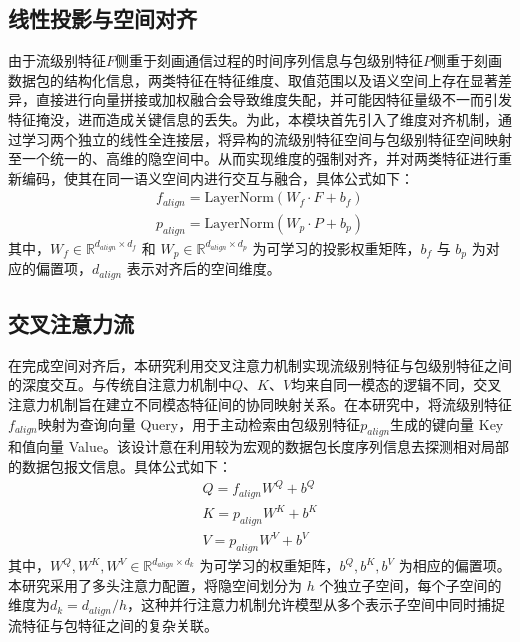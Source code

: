 \subsection{线性投影与空间对齐}
由于流级别特征$F$侧重于刻画通信过程的时间序列信息与包级别特征$P$侧重于刻画数据包的结构化信息，两类特征在特征维度、取值范围以及语义空间上存在显著差异，直接进行向量拼接或加权融合会导致维度失配，并可能因特征量级不一而引发特征掩没，进而造成关键信息的丢失。为此，本模块首先引入了维度对齐机制，通过学习两个独立的线性全连接层，将异构的流级别特征空间与包级别特征空间映射至一个统一的、高维的隐空间中。从而实现维度的强制对齐，并对两类特征进行重新编码，使其在同一语义空间内进行交互与融合，具体公式如下：
\begin{equation}
  \begin{gathered}
  f_{align} = \text{LayerNorm}(W_f \cdot F + b_f) \\
  p_{align} = \text{LayerNorm}(W_p \cdot P + b_p)
  \end{gathered}
  \label{eq:align2}
\end{equation}
其中，$W_f \in \mathbb{R}^{d_{align} \times d_f}$ 和 $W_p \in \mathbb{R}^{d_{align} \times d_p}$ 为可学习的投影权重矩阵，$b_f$ 与 $b_p$ 为对应的偏置项，$d_{align}$ 表示对齐后的空间维度。

\subsection{交叉注意力流}
在完成空间对齐后，本研究利用交叉注意力机制实现流级别特征与包级别特征之间的深度交互。与传统自注意力机制中$Q$、$K$、$V$均来自同一模态的逻辑不同，交叉注意力机制旨在建立不同模态特征间的协同映射关系。在本研究中，将流级别特征$f_{align}$映射为查询向量 Query，用于主动检索由包级别特征$p_{align}$生成的键向量 Key 和值向量 Value。该设计意在利用较为宏观的数据包长度序列信息去探测相对局部的数据包报文信息。具体公式如下：
\begin{equation}
  \begin{gathered}
  Q = f_{align} W^Q + b^Q\\
  K = p_{align} W^K + b^K\\
  V = p_{align} W^V + b^V
  \end{gathered}
  \label{eq:attention}
\end{equation}
其中，$W^Q, W^K, W^V \in \mathbb{R}^{d_{align} \times d_k}$ 为可学习的权重矩阵，$b^Q, b^K, b^V$ 为相应的偏置项。本研究采用了多头注意力配置，将隐空间划分为 $h$ 个独立子空间，每个子空间的维度为$d_k = d_{align} / h$，这种并行注意力机制允许模型从多个表示子空间中同时捕捉流特征与包特征之间的复杂关联。

